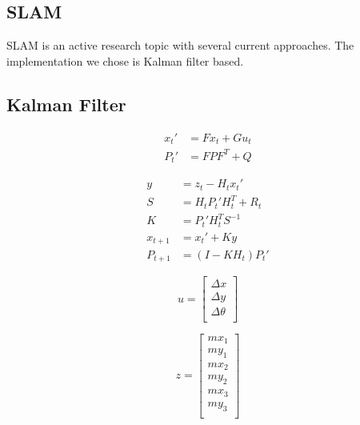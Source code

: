 \documentclass[prodmode,acmtecs]{acmsmall} %
\begin{document}
\subsection{SLAM}

SLAM is an active research topic with several current approaches.  The implementation we chose is Kalman filter based.

\subsection{Kalman Filter}

\begin{align*}
    x_t' &= F x_t + G u_t \\
    P_t' &= F P F^T + Q
\end{align*}

\begin{align*}
    y &= z_t - H_t x_t' \\
    S &= H_t P_t' H^T_t + R_t \\
    K &= P_t' H^T_t S^{-1} \\
    x_{t+1} &= x_t' + Ky \\
    P_{t+1} &= (I - K H_t) P_t'
\end{align*}


$$
u = 
\begin{bmatrix}
    \Delta x \\
    \Delta y \\
    \Delta \theta \\
\end{bmatrix}
$$

$$
z = 
\begin{bmatrix}
    mx_1 \\
    my_1 \\
    mx_2 \\
    my_2 \\
    mx_3 \\
    my_3 \\
\end{bmatrix}
$$
\end{document}
